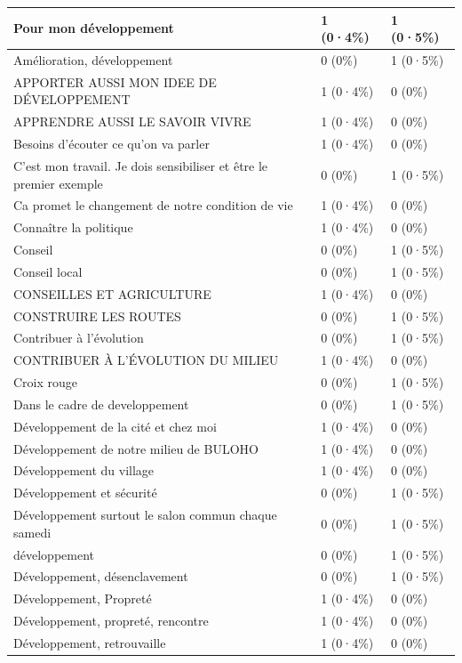 \documentclass[
]{book}
\begin{document}
\begin{tabular}{l|l|l}
\hline
Pour mon développement & 1 (0·4\%) & 1 (0·5\%)\\
\hline
Amélioration, développement & 0 (0\%) & 1 (0·5\%)\\
\hline
APPORTER AUSSI MON IDEE DE DÉVELOPPEMENT & 1 (0·4\%) & 0 (0\%)\\
\hline
APPRENDRE AUSSI LE SAVOIR VIVRE & 1 (0·4\%) & 0 (0\%)\\
\hline
Besoins d'écouter ce qu'on va parler & 1 (0·4\%) & 0 (0\%)\\
\hline
C'est mon travail. Je dois sensibiliser et être le premier exemple & 0 (0\%) & 1 (0·5\%)\\
\hline
Ca promet le changement de notre condition de vie & 1 (0·4\%) & 0 (0\%)\\
\hline
Connaître la politique & 1 (0·4\%) & 0 (0\%)\\
\hline
Conseil & 0 (0\%) & 1 (0·5\%)\\
\hline
Conseil local & 0 (0\%) & 1 (0·5\%)\\
\hline
CONSEILLES ET AGRICULTURE & 1 (0·4\%) & 0 (0\%)\\
\hline
CONSTRUIRE LES ROUTES & 0 (0\%) & 1 (0·5\%)\\
\hline
Contribuer à l'évolution & 0 (0\%) & 1 (0·5\%)\\
\hline
CONTRIBUER À L'ÉVOLUTION DU MILIEU & 1 (0·4\%) & 0 (0\%)\\
\hline
Croix rouge & 0 (0\%) & 1 (0·5\%)\\
\hline
Dans le cadre de developpement & 0 (0\%) & 1 (0·5\%)\\
\hline
Développement de la cité et chez moi & 1 (0·4\%) & 0 (0\%)\\
\hline
Développement de notre milieu de BULOHO & 1 (0·4\%) & 0 (0\%)\\
\hline
Développement du village & 1 (0·4\%) & 0 (0\%)\\
\hline
Développement et sécurité & 0 (0\%) & 1 (0·5\%)\\
\hline
Développement surtout le salon commun chaque samedi & 0 (0\%) & 1 (0·5\%)\\
\hline
développement & 0 (0\%) & 1 (0·5\%)\\
\hline
Développement, désenclavement & 0 (0\%) & 1 (0·5\%)\\
\hline
Développement, Propreté & 1 (0·4\%) & 0 (0\%)\\
\hline
Développement, propreté, rencontre & 1 (0·4\%) & 0 (0\%)\\
\hline
Développement, retrouvaille & 1 (0·4\%) & 0 (0\%)\\

\end{tabular}
\end{document}
